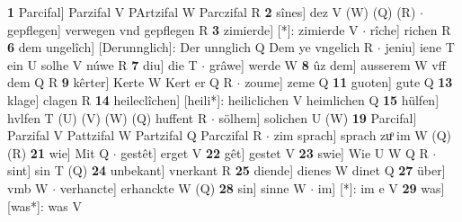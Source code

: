 \documentclass[8pt,a4paper,notitlepage]{article}
\begin{document}
\begin{table}[ht]
\begin{minipage}[t]{0.5\linewidth}
\textbf{1} Parcifal] Parzifal V PArtzifal W Parczifal R \textbf{2} sînes] dez V (W) (Q) (R)  $\cdot$ gepflegen] verwegen vnd gepflegen R \textbf{3} zimierde] [*]: zimierde V  $\cdot$ rîche] richen R \textbf{6} dem ungelîch] [Derunnglich]: Der unnglich Q Dem ye vngelich R  $\cdot$ jeniu] iene T ein U solhe V núwe R \textbf{7} diu] die T  $\cdot$ grâwe] werde W \textbf{8} ûz dem] ausserem W vff dem Q R \textbf{9} kêrter] Kerte W Kert er Q R  $\cdot$ zoume] zeme Q \textbf{11} guoten] gute Q \textbf{13} klage] clagen R \textbf{14} heileclîchen] [heili*]: heiliclichen V heimlichen Q \textbf{15} hülfen] hvlfen T (U) (V) (W) (Q) huffent R  $\cdot$ sölhem] solichen U (W) \textbf{19} Parcifal] Parzifal V Pattzifal W Partzifal Q Parczifal R  $\cdot$ zim sprach] sprach zuͦ im W (Q) (R) \textbf{21} wie] Mit Q  $\cdot$ gestêt] erget V \textbf{22} gêt] gestet V \textbf{23} swie] Wie U W Q R  $\cdot$ sint] sin T (Q) \textbf{24} unbekant] vnerkant R \textbf{25} diende] dienes W dinet Q \textbf{27} über] vmb W  $\cdot$ verhancte] erhanckte W (Q) \textbf{28} sin] sinne W  $\cdot$ im] [*]: im e V \textbf{29} was] [was*]: was V \newline
\end{minipage}
\end{table}
\end{document}
